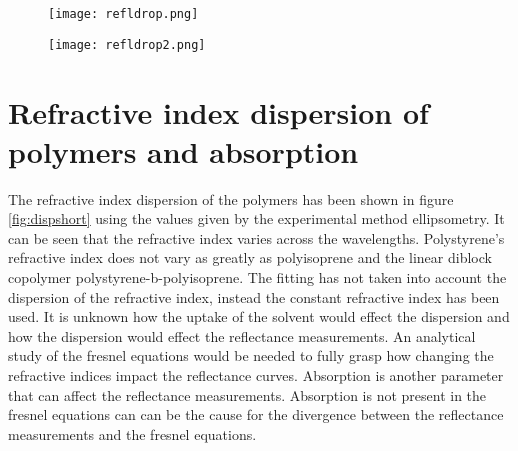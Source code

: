 \documentclass[MasterThesisMain.tex]{subfiles}
\begin{document}
\begin{figure}[H]
\centering
\texttt{[image: refldrop.png]}
\caption{}
\label{fig:drop}
\end{figure}

\begin{figure}[H]
\centering
\texttt{[image: refldrop2.png]}
\caption{}
\label{fig:drop2}
\end{figure}

\section{Refractive index dispersion of polymers and absorption}
The refractive index dispersion of the polymers has been shown in figure \ref{fig:dispshort} using the values given by the experimental method ellipsometry. It can be seen that the refractive index varies across the wavelengths. Polystyrene's refractive index does not vary as greatly as polyisoprene and the linear diblock copolymer polystyrene-b-polyisoprene. The fitting has not taken into account the dispersion of the refractive index, instead the constant refractive index has been used. It is unknown how the uptake of the solvent would effect the dispersion and how the dispersion would effect the reflectance measurements. An analytical study of the fresnel equations would be needed to fully grasp how changing the refractive indices impact the reflectance curves. Absorption is another parameter that can affect the reflectance measurements. Absorption is not present in the fresnel equations can can be the cause for the divergence between the reflectance measurements and the fresnel equations.    
\end{document}
